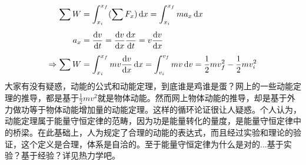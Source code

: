 \begin{prove}
    \begin{equation}
        \begin{aligned}
            \sum W            & =\int_{x_{i}}^{x_{f}}(\sum F_{x})\dif x=\int_{x_{i}}^{x_{f}} ma_{x}\dif x                                                   \\[1ex]
            a_x               & =\frac{\dif v}{\dif t}=\frac{\dif v}{\dif x}\frac{\dif x}{\dif t}=v\frac{\dif v}{\dif x}                                    \\[1ex]
            \Rightarrow\sum W & =\int_{x_{i}}^{x_{f}}mv\frac{\dif v}{\dif x}\dif x=\int_{v_{i}}^{v_{f}}mv\dif v=\frac{1}{2}mv_{f}^{2}-\frac{1}{2}mv_{i}^{2}
        \end{aligned}
        \nonumber
    \end{equation}
    大家有没有疑惑，动能的公式和动能定理，到底谁是鸡谁是蛋？网上的一些动能定理的推导，都是基于$\frac{1}{2}mv^{2} $就是物体动能。然而网上物体动能的推导，却是基于外力做功等于物体动能增加量的动能定理。这样的循环论证很让人疑惑。个人认为，动能定理属于能量守恒定律的范畴，因为功是能量转化的量度，是能量守恒定律中的桥梁。在此基础上，人为规定了合理的动能的表达式，而且经过实验和理论的验证，这个定义是合理，体系是自洽的。至于能量守恒定律为什么是对的...基于实验？基于经验？详见热力学吧。
\end{prove}

